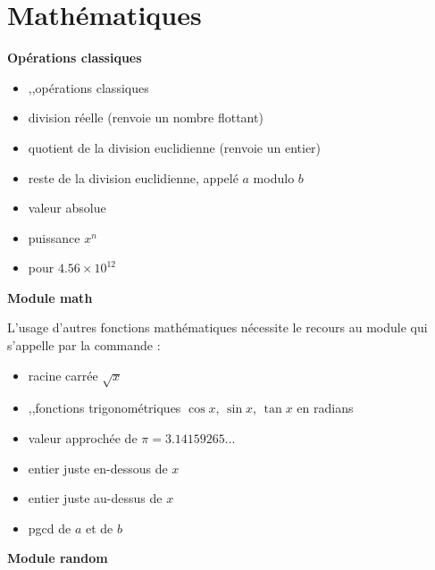 \documentclass[11pt,class=report,crop=false]{standalone}
\begin{document}


\section{Mathématiques}

\textbf{Opérations classiques}
\begin{itemize}
  \item {},\quad {},\quad {}\quad  opérations classiques
  \item {}\quad division \og{}réelle\fg{} (renvoie un nombre flottant)
  \item {}\quad quotient de la division euclidienne (renvoie un entier)
  \item {}\quad reste de la division euclidienne, appelé $a$ modulo $b$
  \item {}\quad valeur absolue
  \item {}\quad puissance $x^n$
  \item {}\quad pour $4.56 \times 10^{12}$
\end{itemize}

\bigskip

\textbf{Module \og{}math\fg{}}

L'usage d'autres fonctions mathématiques nécessite le recours au module  qui s'appelle par la commande :

\begin{itemize}
  \item {}\quad racine carrée $\sqrt{x}$
  \item {},\quad {},\quad {}\quad fonctions trigonométriques $\cos x$, $\sin x$, $\tan x$ en radians
  \item {}\quad valeur approchée de $\pi = 3.14159265\ldots$
  \item {}\quad  entier juste en-dessous de $x$
  \item {}\quad  entier juste au-dessus de $x$
  \item {}\quad pgcd de $a$ et de $b$
 \end{itemize}
 \bigskip

\textbf{Module \og{}random\fg{}}
\end{document}
